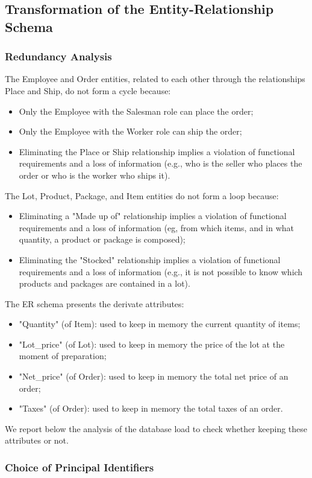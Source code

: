 \subsection{Transformation of the Entity-Relationship Schema}

\subsubsection{Redundancy Analysis}


The Employee and Order entities, related to each other through the relationships Place and Ship, do not form a cycle because:
\begin{itemize}
        \vspace{-1em}
        \item Only the Employee with the Salesman role can place the order;
        \item Only the Employee with the Worker role can ship the order;
        \item Eliminating the Place or Ship relationship implies a violation of functional requirements and a loss of information (e.g., who is the seller who places the order or who is the worker who ships it).
\end{itemize}

The Lot, Product, Package, and Item entities do not form a loop because:
\begin{itemize}
        \vspace{-1em}
        \item Eliminating a "Made up of" relationship implies a violation of functional requirements and a loss of information (eg, from which items, and in what quantity, a product or package is composed);
        \item Eliminating the "Stocked" relationship implies a violation of functional requirements and a loss of information (e.g., it is not possible to know which products and packages are contained in a lot).
\end{itemize}


The ER schema presents the derivate attributes:
\begin{itemize}
        \vspace{-1em}
        \item "Quantity" (of Item): used to keep in memory the current quantity of items;
        \item "Lot_price" (of Lot): used to keep in memory the price of the lot at the moment of preparation;
        \item "Net_price" (of Order): used to keep in memory the total net price of an order;
        \item "Taxes" (of Order): used to keep in memory the total taxes of an order.
\end{itemize}

We report below the analysis of the database load to check whether keeping these attributes or not.

\subsubsection{Choice of Principal Identifiers}